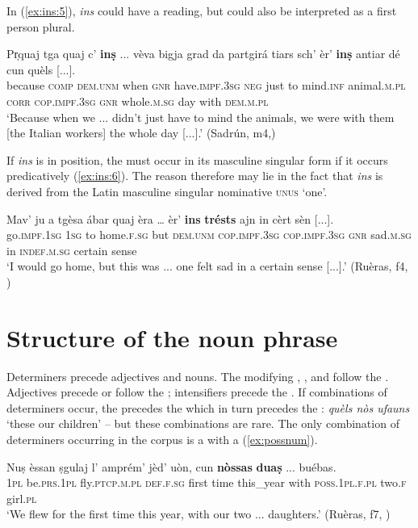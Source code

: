 In (\ref{ex:ins:5}), \textit{ins} could have a  reading, but could also be interpreted as a first person plural.

\ea
\label{ex:ins:5}
\gll  Pr̩quaj tga quaj c’ \textbf{inṣ} ... vèva bigja grad da partgirá tiars sch’ èr’ \textbf{inṣ} antiar dé cun quèls [...].  \\
because \textsc{comp} \textsc{dem.unm} when \textsc{gnr} {} have.\textsc{impf.3sg}  \textsc{neg} just to mind.\textsc{inf} animal.\textsc{m.pl} \textsc{corr} \textsc{cop.impf.3sg} \textsc{gnr} whole.\textsc{m.sg} day with \textsc{dem.m.pl}\\
\glt `Because when we ... didn’t just have to mind the animals, we were with them [the Italian workers] the whole day [...].' (Sadrún, m4,)
\z

If \textit{ins} is in  position, the  must occur in its masculine singular form if it occurs predicatively (\ref{ex:ins:6}). The reason therefore may lie in the fact that \textit{ins} is derived from the Latin masculine singular nominative \textsc{unus} `one'.

\ea
\label{ex:ins:6}
	\gll  Mav’ ju a tgèsa ábar quaj èra … èr’ \textbf{ins} \textbf{trésts} ajn in cèrt sèn [...].\\
go.\textsc{impf.1sg} \textsc{1sg} to home.\textsc{f.sg} but \textsc{dem.unm} \textsc{cop.impf.3sg} {} \textsc{cop.impf.3sg} \textsc{gnr} sad.\textsc{m.sg} in \textsc{indef.m.sg} certain sense\\
\glt `I would go home, but this was ... one felt sad in a certain sense [...].' (Ruèras, f4, )
\z



\section{Structure of the noun phrase}\label{3.9}
Determiners precede adjectives and nouns. The modifying , , and  follow the . Adjectives precede or follow the ; intensifiers precede the . If combinations of determiners occur, the  precedes the  which in turn precedes the : \textit{quèls nòs ufauns} `these our children' -- but these combinations are rare. The only combination of determiners occurring in the corpus is a  with a  (\ref{ex:possnum}).

\ea
\label{ex:possnum}
\gll  Nuṣ èssan ṣgulaj l’ amprém’ jèd’ uòn, cun \textbf{nòssas} \textbf{duaṣ} ... buébas.\\
\textsc{1pl} be.\textsc{prs.1pl} fly.\textsc{ptcp.m.pl} \textsc{def.f.sg} first time this\_year with \textsc{poss.1pl.f.pl} two.\textsc{f} {} girl.\textsc{pl}\\
\glt `We flew for the first time this year, with our two ... daughters.' (Ruèras, f7, )
\z
